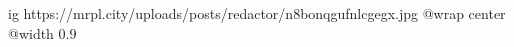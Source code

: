  
 
 
 
 

\ifcmt
  ig https://mrpl.city/uploads/posts/redactor/n8bonqgufnlcgegx.jpg
  @wrap center
  @width 0.9
\fi
